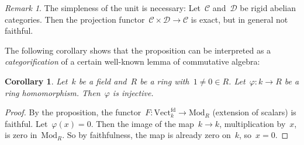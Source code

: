 \documentclass[a4paper,english,12pt]{scrartcl}
\theoremstyle{definition}
\theoremstyle{plain}
\newtheorem{cor}[defn]{Corollary}
\theoremstyle{remark}
\newtheorem{rem}[defn]{Remark}
\newcommand{\C}{\mathcal{C}}
\newcommand{\D}{\mathcal{D}}
\renewcommand{\_}{\mathpunct{.}\,}
\newcommand{\?}{\,{:}\,}
\newcommand{\Mod}{\mathrm{Mod}}
\newcommand{\Vect}{\mathrm{Vect}}
\begin{document}
\begin{rem}The simpleness of the unit is necessary: Let~$\C$ and~$\D$ be rigid abelian
categories. Then the projection functor~$\C \times \D \to \C$
is exact, but in general not faithful.\end{rem}

The following corollary shows that the proposition can be interpreted as a
\emph{categorification} of a certain well-known lemma of commutative algebra:

\begin{cor}Let~$k$ be a field and~$R$ be a ring with~$1 \neq 0 \in R$.
Let~$\varphi : k \to R$ be a ring homomorphism. Then~$\varphi$ is
injective.\end{cor}
\begin{proof}By the proposition, the functor~$F : \Vect_k^\mathrm{fd} \to
\Mod_R$ (extension of scalars) is faithful. Let~$\varphi(x) = 0$. Then the
image of the map~$k \to k$, multiplication by~$x$, is zero in~$\Mod_R$. So by
faithfulness, the map is already zero on~$k$, so~$x = 0$.\end{proof}
\end{document}
